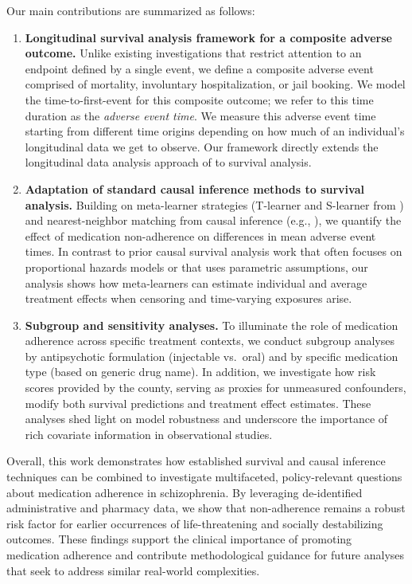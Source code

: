 Our main contributions are summarized as follows:
\begin{enumerate}[itemsep=0pt]
    \item \textbf{Longitudinal survival analysis framework for a composite adverse outcome.}
    Unlike existing investigations that restrict attention to an endpoint defined by a single event, we define a composite adverse event comprised of mortality, involuntary hospitalization, or jail booking. We model the time-to-first-event for this composite outcome; we refer to this time duration as the \emph{adverse event time}. We measure this adverse event time starting from different time origins depending on how much of an individual's longitudinal data we get to observe. Our framework directly extends the longitudinal data analysis approach of \citet{fitzmaurice2009longitudinal} to survival analysis.
    \item \textbf{Adaptation of standard causal inference methods to survival analysis.}
    Building on meta-learner strategies (T-learner and S-learner from \citet{kunzel2019metalearners}) and nearest-neighbor matching from causal inference (e.g., \citealt{stuart2010matching}), we quantify the effect of medication non-adherence on differences in mean adverse event times.
    In contrast to prior causal survival analysis work that often focuses on proportional hazards models or that uses parametric assumptions, our analysis shows how meta-learners can estimate individual and average treatment effects when censoring and time-varying exposures arise.

    \item \textbf{Subgroup and sensitivity analyses.}
    To illuminate the role of medication adherence across specific treatment contexts, we conduct subgroup analyses by antipsychotic formulation (injectable vs.\ oral) and by specific medication type (based on generic drug name).
    In addition, we investigate how risk scores provided by the county, serving as proxies for unmeasured confounders, modify both survival predictions and treatment effect estimates.
    These analyses shed light on model robustness and underscore the importance of rich covariate information in observational studies.
\end{enumerate}
Overall, this work demonstrates how established survival and causal inference techniques can be combined to investigate multifaceted, policy-relevant questions about medication adherence in schizophrenia.
By leveraging de-identified administrative and pharmacy data, we show that non-adherence remains a robust risk factor for earlier occurrences of life-threatening and socially destabilizing outcomes.
These findings support the clinical importance of promoting medication adherence and contribute methodological guidance for future analyses that seek to address similar real-world complexities.

